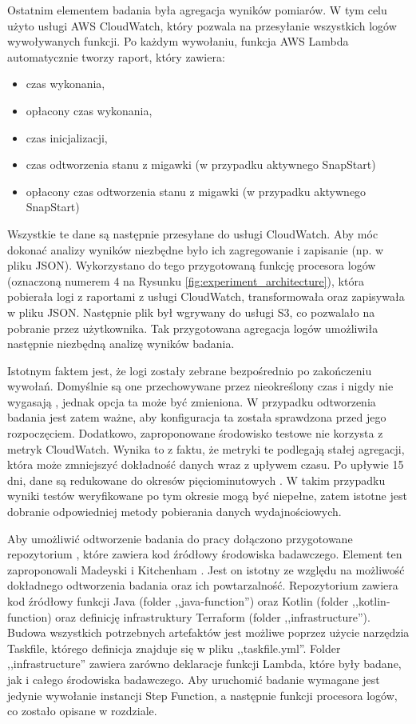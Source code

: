 Ostatnim elementem badania była agregacja wyników pomiarów.
W tym celu użyto usługi AWS CloudWatch, który pozwala na przesyłanie wszystkich logów wywoływanych funkcji.
Po każdym wywołaniu, funkcja AWS Lambda automatycznie tworzy raport, który zawiera:
\begin{itemize}
    \item czas wykonania,
    \item opłacony czas wykonania,
    \item czas inicjalizacji,
    \item czas odtworzenia stanu z migawki (w przypadku aktywnego SnapStart)
    \item opłacony czas odtworzenia stanu z migawki (w przypadku aktywnego SnapStart)
\end{itemize}
Wszystkie te dane są następnie przesyłane do usługi CloudWatch. 
Aby móc dokonać analizy wyników niezbędne było ich zagregowanie i zapisanie (np. w pliku JSON).
Wykorzystano do tego przygotowaną funkcję procesora logów (oznaczoną numerem 4 na Rysunku \ref{fig:experiment_architecture}), która pobierała logi z raportami z usługi CloudWatch, transformowała oraz zapisywała w pliku JSON.
Następnie plik był wgrywany do usługi S3, co pozwalało na pobranie przez użytkownika.
Tak przygotowana agregacja logów umożliwiła następnie niezbędną analizę wyników badania.

Istotnym faktem jest, że logi zostały zebrane bezpośrednio po zakończeniu wywołań.
Domyślnie są one przechowywane przez nieokreślony czas i nigdy nie wygasają \cite{AWSCloudWatchLogs}, jednak opcja ta może być zmieniona.
W przypadku odtworzenia badania jest zatem ważne, aby konfiguracja ta została sprawdzona przed jego rozpoczęciem.
Dodatkowo, zaproponowane środowisko testowe nie korzysta z metryk CloudWatch.
Wynika to z faktu, że metryki te podlegają stałej agregacji, która może zmniejszyć dokładność danych wraz z upływem czasu.
Po upływie 15 dni, dane są redukowane do okresów pięciominutowych \cite{AWSCloudWatchLogs}.
W takim przypadku wyniki testów weryfikowane po tym okresie mogą być niepełne, zatem istotne jest dobranie odpowiedniej metody pobierania danych wydajnościowych.

Aby umożliwić odtworzenie badania do pracy dołączono przygotowane repozytorium \cite{RepozytoriumEksperyment}, które zawiera kod źródłowy środowiska badawczego.
Element ten zaproponowali Madeyski i Kitchenham \cite{wouldWiderAdoption}. 
Jest on istotny ze względu na możliwość dokładnego odtworzenia badania oraz ich powtarzalność.
Repozytorium zawiera kod źródłowy funkcji Java (folder ,,java-function'') oraz Kotlin (folder ,,kotlin-function) oraz definicję infrastruktury Terraform (folder ,,infrastructure'').
Budowa wszystkich potrzebnych artefaktów jest możliwe poprzez użycie narzędzia Taskfile, którego definicja znajduje się w pliku ,,taskfile.yml''.
Folder ,,infrastructure'' zawiera zarówno deklaracje funkcji Lambda, które były badane, jak i całego środowiska badawczego.
Aby uruchomić badanie wymagane jest jedynie wywołanie instancji Step Function, a następnie funkcji procesora logów, co zostało opisane w rozdziale. 

